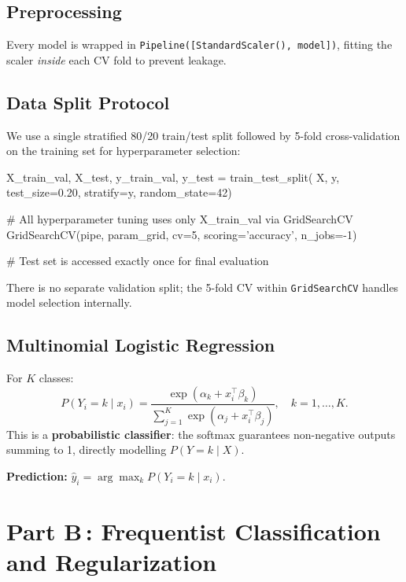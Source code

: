 \documentclass[10pt, letterpaper]{article}
\begin{document}
\subsection{Preprocessing}
Every model is wrapped in \texttt{Pipeline([StandardScaler(), model])}, fitting the scaler \emph{inside} each CV fold to prevent leakage.

\subsection{Data Split Protocol}
We use a single stratified 80/20 train/test split followed by 5-fold cross-validation on the training set for hyperparameter selection:

\begin{code}
X_train_val, X_test, y_train_val, y_test = train_test_split(
    X, y, test_size=0.20, stratify=y, random_state=42)

# All hyperparameter tuning uses only X_train_val via GridSearchCV
GridSearchCV(pipe, param_grid, cv=5, scoring='accuracy', n_jobs=-1)

# Test set is accessed exactly once for final evaluation
\end{code}

There is no separate validation split; the 5-fold CV within \texttt{GridSearchCV} handles model selection internally.

\subsection{Multinomial Logistic Regression}
For $K$ classes:
\[
P(Y_i = k \mid x_i) = \frac{\exp(\alpha_k + x_i^\top \beta_k)}{\sum_{j=1}^{K} \exp(\alpha_j + x_i^\top \beta_j)}, \quad k = 1, \dots, K.
\]
This is a \textbf{probabilistic classifier}: the softmax guarantees non-negative outputs summing to 1, directly modelling $P(Y = k \mid X)$. 

\textbf{Prediction:} $\hat{y}_i = \arg\max_k P(Y_i = k \mid x_i)$.

\section{Part B\,: Frequentist Classification and Regularization}
\end{document}
